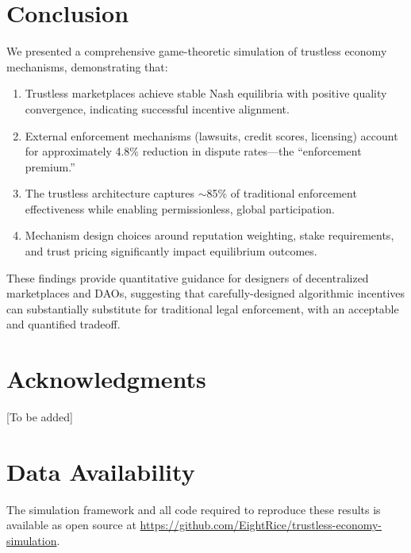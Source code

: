 \documentclass[11pt,a4paper]{article}
\begin{document}
\section{Conclusion}

We presented a comprehensive game-theoretic simulation of trustless economy mechanisms, demonstrating that:

\begin{enumerate}
    \item Trustless marketplaces achieve stable Nash equilibria with positive quality convergence, indicating successful incentive alignment.

    \item External enforcement mechanisms (lawsuits, credit scores, licensing) account for approximately 4.8\% reduction in dispute rates---the ``enforcement premium.''

    \item The trustless architecture captures $\sim$85\% of traditional enforcement effectiveness while enabling permissionless, global participation.

    \item Mechanism design choices around reputation weighting, stake requirements, and trust pricing significantly impact equilibrium outcomes.
\end{enumerate}

These findings provide quantitative guidance for designers of decentralized marketplaces and DAOs, suggesting that carefully-designed algorithmic incentives can substantially substitute for traditional legal enforcement, with an acceptable and quantified tradeoff.

\section*{Acknowledgments}

[To be added]

\section*{Data Availability}

The simulation framework and all code required to reproduce these results is available as open source at \url{https://github.com/EightRice/trustless-economy-simulation}.
\end{document}
